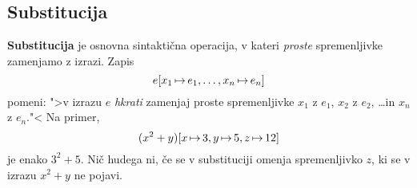 \subsection{Substitucija}
\label{sec:substitucija}

\textbf{Substitucija} je osnovna sintaktična operacija, v kateri
\emph{proste} spremenljivke zamenjamo z izrazi. Zapis
%
\begin{equation*}
  e[x_1 \,{\mapsto}\, e_1, \ldots, x_n \,{\mapsto}\, e_n]
\end{equation*}
%
pomeni: ">v izrazu $e$ \emph{hkrati} zamenjaj proste spremenljivke
$x_1$ z $e_1$, $x_2$ z $e_2$, \dots in $x_n$ z $e_n$."<  Na primer,
%
\begin{equation*}
  (x^2 + y)[x \,{\mapsto}\, 3, y \,{\mapsto}\, 5, z \,{\mapsto}\, 12]
\end{equation*}
%
je enako $3^2 + 5$. Nič hudega ni, če se v substituciji omenja
spremenljivko $z$, ki se v izrazu $x^2 + y$ ne pojavi.

